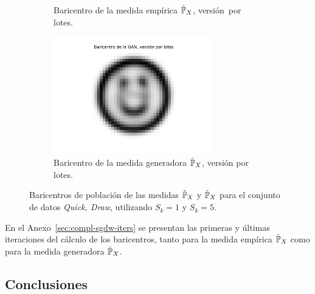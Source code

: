 \begin{figure}[htbp]
\begin{subfigure}[b]{0.45\textwidth}
        \caption{Baricentro de la medida empírica $\hat\Prob_X$, versión~por lotes.}
        \label{fig:batch-bar-DS}
    \end{subfigure}
    \hfill
    \begin{subfigure}[b]{0.45\textwidth}
        \centering
        \includegraphics[width=0.75\textwidth]{img/barycenters/batch-bar-GAN.pdf}
        \caption{Baricentro de la medida generadora $\tilde\Prob_X$, versión por lotes.}
        \label{fig:batch-bar-GAN}
    \end{subfigure}
    \caption{Baricentros de población de las medidas $\hat\Prob_X$ y $\tilde\Prob_X$ para el conjunto de datos \textit{Quick, Draw}, utilizando $S_k=1$ y $S_k=5$.}
    \label{fig:barycenters}
\end{figure}

En el Anexo~\ref{sec:compl-sgdw-iters} se presentan las primeras y últimas iteraciones del cálculo de los baricentros, tanto para la medida empírica $\hat\Prob_X$ como para la medida generadora $\tilde\Prob_X$.














\subsection{Conclusiones}\label{ssec:sgdw-conclusiones}  %



